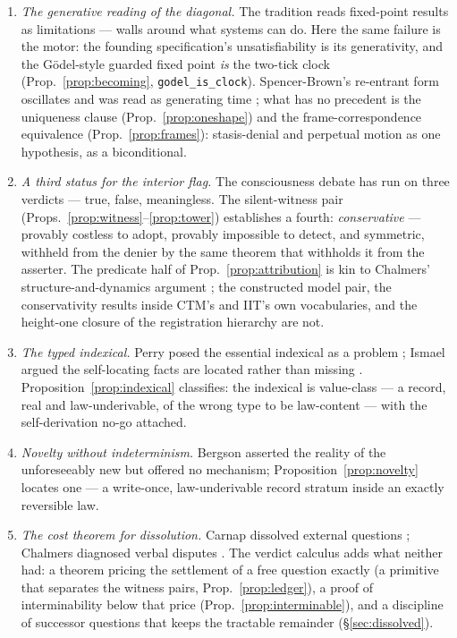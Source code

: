 \documentclass[11pt]{article}
\theoremstyle{remark}
\newcommand{\lf}[1]{\texttt{#1}}       %
\begin{document}
\begin{enumerate}[leftmargin=1.8em, itemsep=3pt]
\item \emph{The generative reading of the diagonal.} The tradition reads fixed-point results as limitations --- walls around what systems can do. Here the same failure is the motor: the founding specification's unsatisfiability is its generativity, and the G\"odel-style guarded fixed point \emph{is} the two-tick clock (Prop.~\ref{prop:becoming}, \lf{godel\_is\_clock}). Spencer-Brown's re-entrant form oscillates and was read as generating time \cite{spencerbrown1969,kauffmanvarela1980}; what has no precedent is the uniqueness clause (Prop.~\ref{prop:oneshape}) and the frame-correspondence equivalence (Prop.~\ref{prop:frames}): stasis-denial and perpetual motion as one hypothesis, as a biconditional.
\item \emph{A third status for the interior flag.} The consciousness debate has run on three verdicts --- true, false, meaningless. The silent-witness pair (Props.~\ref{prop:witness}--\ref{prop:tower}) establishes a fourth: \emph{conservative} --- provably costless to adopt, provably impossible to detect, and symmetric, withheld from the denier by the same theorem that withholds it from the asserter. The predicate half of Prop.~\ref{prop:attribution} is kin to Chalmers' structure-and-dynamics argument \cite{chalmers1996}; the constructed model pair, the conservativity results inside CTM's and IIT's own vocabularies, and the height-one closure of the registration hierarchy are not.
\item \emph{The typed indexical.} Perry posed the essential indexical as a problem \cite{perry1979}; Ismael argued the self-locating facts are located rather than missing \cite{ismael2007}. Proposition~\ref{prop:indexical} classifies: the indexical is value-class --- a record, real and law-underivable, of the wrong type to be law-content --- with the self-derivation no-go attached.
\item \emph{Novelty without indeterminism.} Bergson asserted the reality of the unforeseeably new \cite{bergson1907} but offered no mechanism; Proposition~\ref{prop:novelty} locates one --- a write-once, law-underivable record stratum inside an exactly reversible law.
\item \emph{The cost theorem for dissolution.} Carnap dissolved external questions \cite{carnap1950}; Chalmers diagnosed verbal disputes \cite{chalmers2011}. The verdict calculus adds what neither had: a theorem pricing the settlement of a free question exactly (a primitive that separates the witness pairs, Prop.~\ref{prop:ledger}), a proof of interminability below that price (Prop.~\ref{prop:interminable}), and a discipline of successor questions that keeps the tractable remainder (\S\ref{sec:dissolved}).

\end{enumerate}
\end{document}
